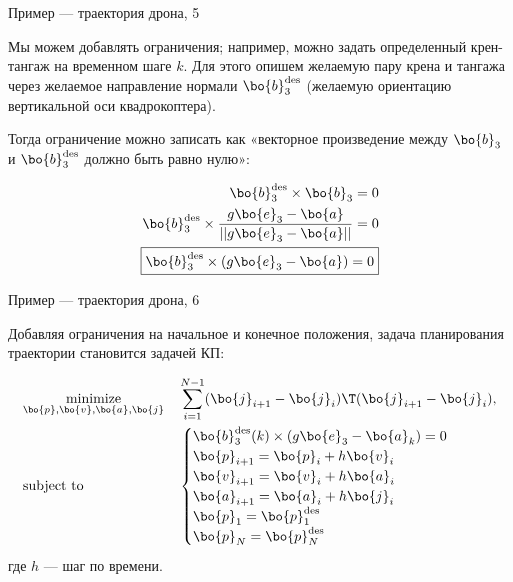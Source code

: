 \begin{frame}{Пример — траектория дрона, 5}
	\begin{flushleft}
		
		Мы можем добавлять ограничения; например, можно задать определенный крен-тангаж на временном шаге $k$. Для этого опишем желаемую пару крена и тангажа через желаемое направление нормали $\bo{b}_3^\text{des}$ (желаемую ориентацию вертикальной оси квадрокоптера). 
		
		\bigskip
		
		Тогда ограничение можно записать как «векторное произведение между $\bo{b}_3$ и $\bo{b}_3^\text{des}$ должно быть равно нулю»:
		
		\begin{align}
			\bo{b}_3^\text{des} \times \bo{b}_3 = 0
			\\
			\bo{b}_3^\text{des} \times   \frac{g \bo{e}_3 - \bo{a}}{||g \bo{e}_3 - \bo{a}||} = 0
			\\
			\boxed{
				\bo{b}_3^\text{des} \times (g \bo{e}_3 - \bo{a}) = 0
			}
		\end{align} 
		
		
	\end{flushleft}
\end{frame}



\begin{frame}{Пример — траектория дрона, 6}
	\begin{flushleft}
		
		Добавляя ограничения на начальное и конечное положения, задача планирования траектории становится задачей КП:
		
		\begin{equation}
			\begin{aligned}
				& \underset{\bo{p},\bo{v},\bo{a},\bo{j}}{\text{minimize}}
				& &\sum_{i = 1}^{N-1} ( \bo{j}_{i+1} - \bo{j}_i)\T ( \bo{j}_{i+1} - \bo{j}_i), \\
				& \text{subject to}
				& & \begin{cases}
					\bo{b}_3^\text{des}(k) \times (g \bo{e}_3 - \bo{a}_k) = 0
					\\
					\bo{p}_{i+1} = \bo{p}_i + h \bo{v}_i \\
					\bo{v}_{i+1} = \bo{v}_i + h \bo{a}_i \\
					\bo{a}_{i+1} = \bo{a}_i + h \bo{j}_i 
					\\
					\bo{p}_1 = \bo{p}_1^\text{des}
					\\
					\bo{p}_N = \bo{p}_N^\text{des}
				\end{cases}
			\end{aligned}
		\end{equation}
		где $h$ — шаг по времени.
		
	\end{flushleft}
\end{frame}



